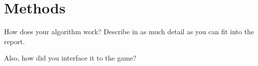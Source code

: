 \section{Methods}
\label{04}

How does your algorithm work? Describe in as much detail as you can fit into the report. 

Also, how did you interface it to the game?
